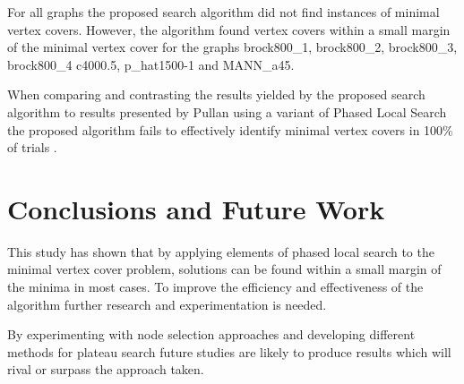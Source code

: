 \documentclass[conference,letterpaper]{IEEEtran}
\begin{document}
\par For all graphs the proposed search algorithm did not find instances of minimal vertex covers. However, the algorithm found vertex covers within a small margin of the minimal vertex cover for the graphs brock800\_1, brock800\_2, brock800\_3, brock800\_4 c4000.5, p\_hat1500-1 and MANN\_a45. 
\par When comparing and contrasting the results yielded by the proposed search algorithm to results presented by Pullan using a variant of Phased Local Search the proposed algorithm fails to effectively identify minimal vertex covers in 100\% of trials \cite{pullan09}.

\section{Conclusions and Future Work}
This study has shown that by applying elements of phased local search to the minimal vertex cover problem, solutions can be found within a small margin of the minima in most cases. To improve the efficiency and effectiveness of the algorithm further research and experimentation is needed.
\par By experimenting with node selection approaches and developing different methods for plateau search future studies are likely to produce results which will rival or surpass the approach taken.

\newpage




%
%
\end{document}

